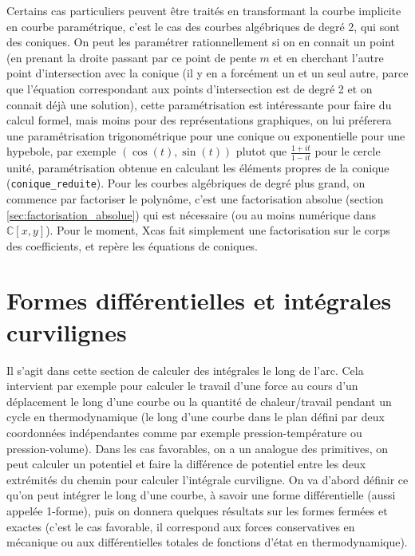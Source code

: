 \documentclass[a4paper,11pt]{article}
\newcommand{\C}{{\mathbb{C}}}
\begin{document}
Certains cas particuliers peuvent \^etre trait\'es en
transformant la courbe implicite en courbe param\'etrique,
c'est le cas des courbes alg\'ebriques de degr\'e 2, qui
sont des coniques. On peut les param\'etrer rationnellement
si on en connait un point (en prenant la droite passant par ce point
de pente $m$ et en cherchant l'autre point d'intersection
avec la conique (il y en a forc\'ement un et un seul autre,
parce que l'\'equation correspondant aux points
d'intersection est de degr\'e 2
et on connait d\'ej\`a une solution), cette param\'etrisation
est int\'eressante pour faire du calcul formel, mais moins
pour des repr\'esentations graphiques, on lui pr\'eferera
une param\'etrisation trigonom\'etrique pour une conique
ou exponentielle pour une hypebole, par exemple
$(\cos(t),\sin(t))$ plutot que $\frac{1+it}{1-it}$ pour
le cercle unit\'e, param\'etrisation obtenue en calculant
les \'el\'ements propres de la conique (\verb|conique_reduite|). 
Pour les courbes alg\'ebriques de degr\'e
plus grand, on commence par factoriser le polyn\^ome,
c'est une factorisation absolue (section \ref{sec:factorisation_absolue}) qui est n\'ecessaire (ou
au moins num\'erique dans $\C[x,y]$). Pour le moment,
Xcas fait simplement une factorisation sur le corps
des coefficients, et rep\`ere les \'equations de coniques.


\section{Formes diff\'erentielles et int\'egrales curvilignes} 
\label{sec:diff}
Il s'agit dans cette section de calculer des int\'egrales
le long de l'arc. Cela intervient
par exemple pour calculer le travail d'une force au cours d'un
d\'eplacement le long d'une courbe 
ou la quantit\'e de chaleur/travail pendant
un cycle en thermodynamique (le long d'une courbe
dans le plan d\'efini par deux coordonn\'ees ind\'ependantes 
comme par exemple pression-temp\'erature ou pression-volume). 
Dans les cas favorables, on a un analogue des primitives, on peut
calculer un potentiel et faire la diff\'erence de potentiel entre les
deux extr\'emit\'es du chemin pour calculer l'int\'egrale curviligne.
On va d'abord d\'efinir ce
qu'on peut int\'egrer le long d'une courbe, \`a savoir une
forme diff\'erentielle (aussi appel\'ee 1-forme), puis on
donnera quelques r\'esultats sur les formes ferm\'ees et
exactes (c'est le cas favorable, il correspond aux forces
conservatives en m\'ecanique ou aux diff\'erentielles totales
de fonctions d'\'etat en thermodynamique).
\end{document}

